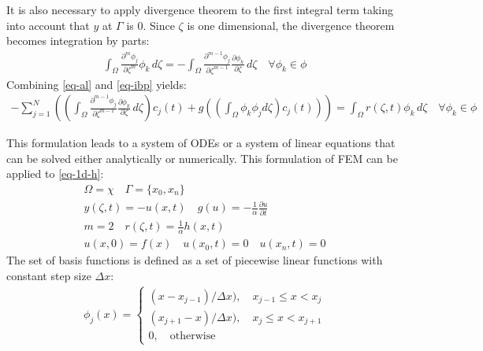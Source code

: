 It is also necessary to apply divergence theorem to the first integral term taking into account that \(y\) at \(\Gamma\) is 0.
Since \(\zeta\) is one dimensional, the divergence theorem becomes integration by parts:
\begin{gather}
\int_{\Omega} \frac{\partial^{m} \phi_{j}}{\partial \zeta^{m}} \phi_{k} \, d\zeta = - \int_{\Omega} \frac{\partial^{m-1} \phi_{j}}{\partial \zeta^{m-1}} \frac{\partial \phi_{k}}{\partial \zeta} \, d\zeta \quad \forall \phi_{k} \in \phi \label{eq-ibp}
\end{gather}
Combining \ref{eq-al} and \ref{eq-ibp} yields:
\begin{gather}
-\sum_{j = 1}^{N} ((\int_{\Omega} \frac{\partial^{m-1} \phi_{j}}{\partial \zeta^{m-1}} \frac{\partial \phi_{k}}{\partial \zeta} \, d\zeta) c_{j}(t) + g((\int_{\Omega} \phi_k \phi_j d\zeta) c_{j}(t)))  = \int_{\Omega}  r(\zeta, t) \phi_{k}        \, d\zeta \quad \forall \phi_{k} \in \phi \label{eq-fem}
\end{gather}

This formulation leads to a system of ODEs or a system of linear equations that can be solved either analytically or numerically. 
This formulation of FEM can be applied to \ref{eq-1d-h}:
\begin{gather}
\Omega = \chi \quad \Gamma = \{x_{0}, x_{n}\} \\
y(\zeta, t) = -u(x, t) \quad g(u) = -\frac{1}{\alpha} \frac{\partial u}{\partial t} \\
m = 2 \quad r(\zeta, t) = \frac{1}{\alpha} h(x,t) \\
u(x, 0) = f(x) \quad u(x_{0}, t) = 0 \quad u(x_{n}, t) = 0
\end{gather}
The set of basis functions is defined as a set of piecewise linear functions with constant step size \(\Delta x\):
\begin{gather}
    \phi_j(x)= 
\begin{cases}
    (x - x_{j-1}) / \Delta x), \quad x_{j-1} \leq x <  x_{j}\\
    (x_{j+1} - x) / \Delta x), \quad x_{j} \leq x <  x_{j + 1}\\
    0,              \quad \text{otherwise}
\end{cases}
\end{gather}
\cite{Gustafsson2011d}


